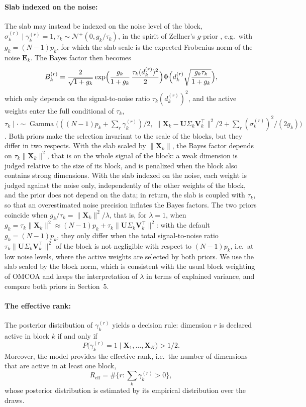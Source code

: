 \documentclass[11pt]{article}
\DeclareMathOperator{\Ga}{Gamma}
\newcommand{\X}{\mathbf{X}}
\newcommand{\U}{\mathbf{U}}
\newcommand{\V}{\mathbf{V}}
\newcommand{\EE}{\mathbf{E}}
\begin{document}
\paragraph{Slab indexed on the noise:} The slab may instead be indexed on the noise level of the block, $\sigma_k^{(r)}\mid\gamma_k^{(r)}=1,\tau_k\sim\mathcal N^+(0,g_k/\tau_k)$, in the spirit of Zellner's $g$-prior \citep{zellner1986,liang2008}, e.g.\ with $g_k=(N-1)p_k$, for which the slab scale is the expected Frobenius norm of the noise $\EE_k$. The Bayes factor then becomes
\[
  B_k^{(r)}=\frac{2}{\sqrt{1+g_k}}\exp\Bigl(\frac{g_k}{1+g_k}\,\frac{\tau_k(d_k^{(r)})^2}{2}\Bigr)\Phi\Bigl(d_k^{(r)}\sqrt{\frac{g_k\tau_k}{1+g_k}}\Bigr),
\]
which only depends on the signal-to-noise ratio $\tau_k(d_k^{(r)})^2$, and the active weights enter the full conditional of $\tau_k$, $\tau_k\mid\cdot\sim\Ga\bigl(((N-1)p_k+\sum_r\gamma_k^{(r)})/2,\ \|\X_k-\U\Sigma_k\V_k^\intercal\|^2/2+\sum_r(\sigma_k^{(r)})^2/(2g_k)\bigr)$. Both priors make the selection invariant to the scale of the blocks, but they differ in two respects. With the slab scaled by $\|\X_k\|$, the Bayes factor depends on $\tau_k\|\X_k\|^2$, that is on the whole signal of the block: a weak dimension is judged relative to the size of its block, and is penalized when the block also contains strong dimensions. With the slab indexed on the noise, each weight is judged against the noise only, independently of the other weights of the block, and the prior does not depend on the data; in return, the slab is coupled with $\tau_k$, so that an overestimated noise precision inflates the Bayes factors. The two priors coincide when $g_k/\tau_k=\|\X_k\|^2/\lambda$, that is, for $\lambda=1$, when $g_k=\tau_k\|\X_k\|^2\approx(N-1)p_k+\tau_k\|\U\Sigma_k\V_k^\intercal\|^2$: with the default $g_k=(N-1)p_k$, they only differ when the total signal-to-noise ratio $\tau_k\|\U\Sigma_k\V_k^\intercal\|^2$ of the block is not negligible with respect to $(N-1)p_k$, i.e.\ at low noise levels, where the active weights are selected by both priors. We use the slab scaled by the block norm, which is consistent with the usual block weighting of OMCOA and keeps the interpretation of $\lambda$ in terms of explained variance, and compare both priors in Section~5.


\paragraph{The effective rank:} The posterior distribution of $\gamma_k^{(r)}$ yields a decision rule: dimension $r$ is declared active in block $k$ if and only if
\begin{equation}
  P\bigl(\gamma_k^{(r)}=1\mid\X_1,\ldots,\X_K\bigr)>1/2 .
  \label{dec_rule}
\end{equation}
\noindent Moreover, the model provides the effective rank, i.e.\ the number of dimensions that are active in at least one block,
\[R_{\mathrm{eff}}=\#\{r:\sum_k\gamma_k^{(r)}>0\},\]
 whose posterior distribution is estimated by its empirical distribution over the draws. 
\end{document}
